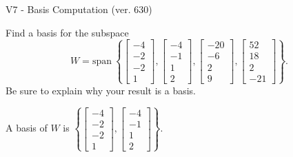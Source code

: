 \begin{exercise}
  \begin{exerciseTitle}V7 - Basis Computation (ver. 630)\end{exerciseTitle}
  \begin{exerciseStatement}
    Find a basis for the subspace 
\[W=\mathrm{span}\ \left\{\left[\begin{array}{r}
-4 \\
-2 \\
-2 \\
1
\end{array}\right] , \left[\begin{array}{r}
-4 \\
-1 \\
1 \\
2
\end{array}\right] , \left[\begin{array}{r}
-20 \\
-6 \\
2 \\
9
\end{array}\right] , \left[\begin{array}{r}
52 \\
18 \\
2 \\
-21
\end{array}\right]\right\}.\]
 Be sure to explain why your result is a basis.


  \end{exerciseStatement}
  \begin{exerciseAnswer}
   A basis of \(W\) is  \(\left\{\left[\begin{array}{r}
-4 \\
-2 \\
-2 \\
1
\end{array}\right] , \left[\begin{array}{r}
-4 \\
-1 \\
1 \\
2
\end{array}\right]\right\}\).
  


  \end{exerciseAnswer}
\end{exercise}